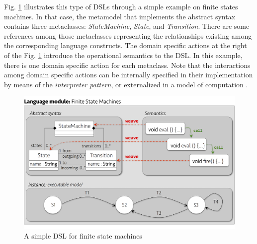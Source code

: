 Fig. \ref{fig:fig-dsl-example} illustrates this type of DSLs through a simple example on finite states machines. In that case, the metamodel that implements the abstract syntax contains three metaclasses: \textsl{StateMachine}, \textsl{State}, and \textsl{Transition}. There are some references among those metaclasses representing the relationships existing among the corresponding language constructs. The domain specific actions at the right of the Fig. \ref{fig:fig-dsl-example} introduce the operational semantics to the DSL. In this example, there is one domain specific action for each metaclass. Note that the interactions among domain specific actions can be internally specified in their implementation by means of the \textit{interpreter pattern}, or externalized in a model of computation \cite{Combemale:2013}.

\begin{figure}
\centering
\includegraphics[width=1\linewidth]{images/fig-dsl-example.png}
\caption{A simple DSL for finite state machines}
\label{fig:fig-dsl-example}
\end{figure}
